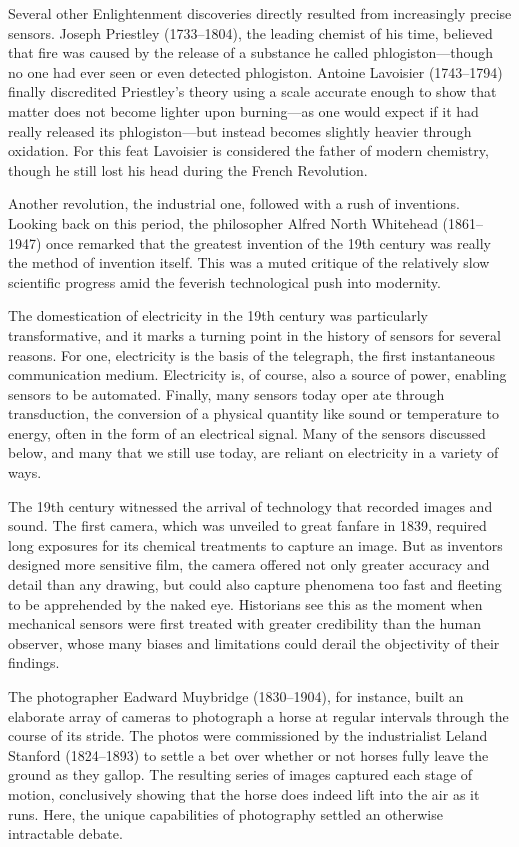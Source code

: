 Several other Enlightenment discoveries directly resulted from increasingly
precise sensors. Joseph Priestley (1733–1804), the leading chemist of his
time, believed that fire was caused by the release of a substance he called
phlogiston—though no one had ever seen or even detected phlogiston.
Antoine Lavoisier (1743–1794) finally discredited Priestley's theory using
a scale accurate enough to show that matter does not become lighter upon
burning—as one would expect if it had really released its phlogiston—but
instead becomes slightly heavier through oxidation. For this feat Lavoisier
is considered the father of modern chemistry, though he still lost his head
during the French Revolution.

Another revolution, the industrial one, followed with a rush of inventions.
Looking back on this period, the philosopher Alfred North Whitehead
(1861–1947) once remarked that the greatest invention of the 19th century
was really the method of invention itself. This was a muted critique of the
relatively slow scientific progress amid the feverish technological push into
modernity.

The domestication of electricity in the 19th century was particularly transformative,
and it marks a turning point in the history of sensors for several
reasons. For one, electricity is the basis of the telegraph, the first instantaneous
communication medium. Electricity is, of course, also a source of
power, enabling sensors to be automated. Finally, many sensors today oper
ate through transduction, the conversion of a physical quantity like sound
or temperature to energy, often in the form of an electrical signal. Many of
the sensors discussed below, and many that we still use today, are reliant on
electricity in a variety of ways.

The 19th century witnessed the arrival of technology that recorded images
and sound. The first camera, which was unveiled to great fanfare in 1839,
required long exposures for its chemical treatments to capture an image.
But as inventors designed more sensitive film, the camera offered not only
greater accuracy and detail than any drawing, but could also capture phenomena
too fast and fleeting to be apprehended by the naked eye. Historians
see this as the moment when mechanical sensors were first treated
with greater credibility than the human observer, whose many biases and
limitations could derail the objectivity of their findings.

The photographer Eadward Muybridge (1830–1904), for instance, built an
elaborate array of cameras to photograph a horse at regular intervals through
the course of its stride. The photos were commissioned by the industrialist
Leland Stanford (1824–1893) to settle a bet over whether or not horses fully
leave the ground as they gallop. The resulting series of images captured each
stage of motion, conclusively showing that the horse does indeed lift into
the air as it runs. Here, the unique capabilities of photography settled an
otherwise intractable debate.

